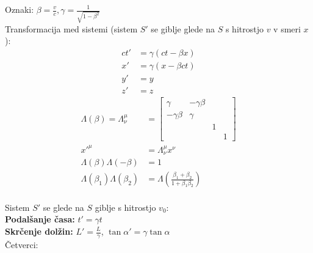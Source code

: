 \documentclass[a4paper, oneside, 12pt]{article}
\theoremstyle{definition}
\begin{document}
Oznaki: $\beta = \frac{v}{c}, \gamma = \frac{1}{\sqrt{1 - \beta^2}}$ \\
Transformacija med sistemi (sistem $S'$ se giblje glede na $S$ s hitrostjo $v$ v smeri $x$):
\begin{align*}
  ct' &= \gamma(ct - \beta x) \\
  x' &= \gamma(x - \beta ct) \\
  y' &= y \\
  z' &= z
\end{align*}
\begin{align*}
 \Lambda(\beta) = \Lambda_{\nu}^{\mu}&=
 \begin{bmatrix}
  \gamma & -\gamma \beta & & \\
  -\gamma \beta & \gamma & & \\
   & & 1 & \\
   & & & 1
 \end{bmatrix} \\
  x'^\mu &= \Lambda^\mu_\nu x^\nu \\
  \Lambda(\beta) \Lambda(- \beta) & = 1 \\
  \Lambda(\beta_1) \Lambda(\beta_2) & = \Lambda(\frac{\beta_1 + \beta_2}{1 + \beta_1 \beta_2})
\end{align*}\\
 Sistem $S'$ se glede na $S$ giblje s hitrostjo $v_0$:  \\
\textbf{Podalšanje časa:} $t' = \gamma t$ \\
\textbf{Skrčenje dolžin:} $L' = \frac{L}{\gamma}$, $\tan  \alpha ' = \gamma \tan \alpha$ \\
Četverci:
\end{document}
